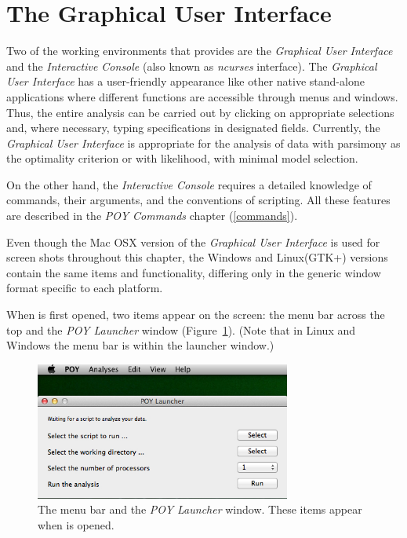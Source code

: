 \section{The Graphical User Interface}

Two of the working environments that \poy provides are the \emph{Graphical User Interface} and the \emph{Interactive Console} (also known as  \emph{ncurses} interface). The \emph{Graphical User Interface} has a user-friendly appearance like other native stand-alone applications where different functions are accessible through menus and windows. Thus, the entire analysis can be carried out by clicking on appropriate selections and, where necessary, typing specifications in designated fields. Currently, the \emph{Graphical User Interface} is appropriate for the analysis of data with parsimony as the  optimality criterion or with likelihood, with minimal model selection.  

On the other hand, the \emph{Interactive Console} requires a detailed knowledge of \poy commands, their arguments, and the conventions of \poy scripting. All these features are described in the \emph{POY Commands} chapter (\ref{commands}).

Even though the Mac OSX version of the \emph{Graphical User Interface} is used for screen shots throughout this chapter, the Windows and Linux(GTK+) versions contain the same items and functionality, differing only in the generic window format specific to each platform.

When \poy is first opened, two items appear on the screen: the menu bar across the top and the \emph{POY Launcher} window (Figure~\ref{fig:menu_launcher_window}). (Note that in Linux and Windows the menu bar is within the launcher window.)

\begin{figure}[htpb]
    \begin{center}
        \includegraphics[width=0.75\textwidth]{doc/figures/menu_launcher_window.jpg}
    \end{center}
    \caption{The \poy menu bar and the \emph{POY Launcher} window. These items appear when \poy is opened.}
    \label{fig:menu_launcher_window}
\end{figure}


